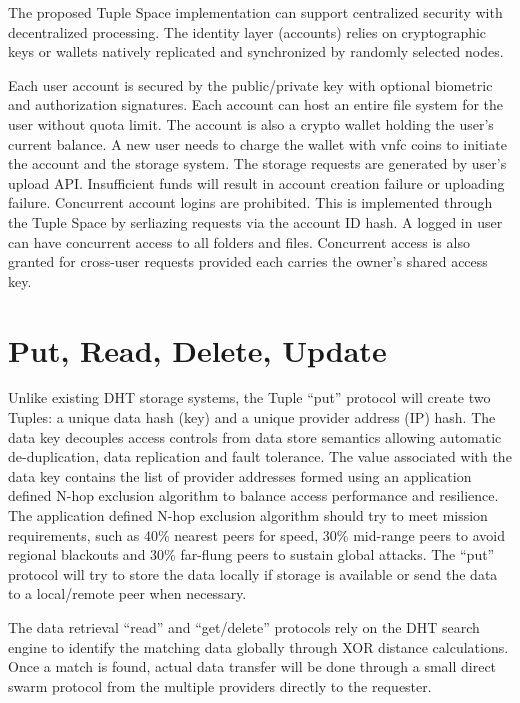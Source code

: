\documentclass[conference]{IEEEtran}
\begin{document}
The proposed Tuple Space implementation can support centralized security with decentralized processing. The identity layer (accounts) relies on cryptographic keys or wallets natively replicated and synchronized by randomly selected nodes.

Each user account is secured by the public/private key with optional biometric and authorization signatures. Each account can host an entire file system for the user without quota limit. The account is also a crypto wallet holding the user’s current balance. A new user needs to charge the wallet with vnfc coins to initiate the account and the storage system. The storage requests are generated by user’s upload API. Insufficient funds will result in account creation failure or uploading failure. Concurrent account logins are prohibited. This is implemented through the Tuple Space by serliazing requests via the account ID hash. A logged in user can have concurrent access to all folders and files. Concurrent access is also granted for cross-user requests provided each carries the owner’s shared access key.

\section{Put, Read, Delete, Update }

Unlike existing DHT storage systems, the Tuple “put” protocol will create two Tuples: a unique data hash (key) and a unique provider address (IP) hash. The data key decouples access controls from data store semantics allowing automatic de-duplication, data replication and fault tolerance. The value associated with the data key contains the list of provider addresses formed using an application defined N-hop exclusion algorithm to balance access performance and resilience. The application defined N-hop exclusion algorithm should try to meet mission requirements, such as 40\% nearest peers for speed, 30\% mid-range peers to avoid regional blackouts and 30\% far-flung peers to sustain global attacks.  The “put” protocol will try to store the data locally if storage is available or send the data to a local/remote peer when necessary.

The data retrieval “read” and “get/delete” protocols rely on the DHT search engine to identify the matching data globally through XOR distance calculations. Once a match is found, actual data transfer will be done through a small direct swarm protocol from the multiple providers directly to the requester.
\end{document}
